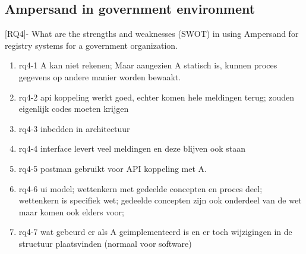 \subsection{Ampersand in government environment}
[RQ4]- What are the strengths and weaknesses (SWOT) in using Ampersand for registry systems for a government organization.
\begin{enumerate}
    \item rq4-1 A kan niet rekenen; Maar aangezien A statisch is, kunnen proces gegevens op andere manier worden bewaakt.
    \item rq4-2 api koppeling werkt goed, echter komen hele meldingen terug; zouden eigenlijk codes moeten krijgen 
    \item rq4-3 inbedden in architectuur 
    \item rq4-4 interface levert veel meldingen en deze blijven ook staan
    \item rq4-5 postman gebruikt voor API koppeling met A. 
    \item rq4-6 ui model; wettenkern met gedeelde concepten en proces deel; wettenkern is specifiek wet; gedeelde concepten zijn ook onderdeel van de wet maar komen ook elders voor;
    \item rq4-7 wat gebeurd er als A geimplementeerd is en er toch wijzigingen in de structuur plaatsvinden (normaal voor software)
\end{enumerate}